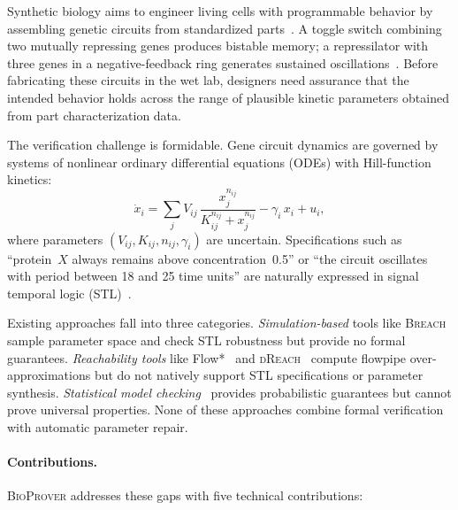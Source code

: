 \documentclass[11pt]{article}
\newcommand{\bioprover}{\textsc{BioProver}}
\newcommand{\dreach}{\textsc{dReach}}
\newcommand{\breach}{\textsc{Breach}}
\newcommand{\stl}{\textsc{STL}}
\begin{document}
Synthetic biology aims to engineer living cells with programmable
behavior by assembling genetic circuits from standardized
parts~\cite{endy2005foundations}. A toggle switch combining two
mutually repressing genes produces bistable memory; a repressilator
with three genes in a negative-feedback ring generates sustained
oscillations~\cite{elowitz2000synthetic}. Before fabricating these
circuits in the wet lab, designers need assurance that the intended
behavior holds across the range of plausible kinetic parameters
obtained from part characterization data.

The verification challenge is formidable. Gene circuit dynamics are
governed by systems of nonlinear ordinary differential equations
(ODEs) with Hill-function kinetics:
\begin{equation}
\label{eq:hill}
  \dot{x}_i = \sum_j V_{ij}\,\frac{x_j^{n_{ij}}}{K_{ij}^{n_{ij}} + x_j^{n_{ij}}}
  - \gamma_i\,x_i + u_i,
\end{equation}
where parameters $(V_{ij}, K_{ij}, n_{ij}, \gamma_i)$ are uncertain.
Specifications such as ``protein~$X$ always remains above
concentration~0.5'' or ``the circuit oscillates with period between
18 and 25 time units'' are naturally expressed in signal temporal
logic (\stl{})~\cite{maler2004monitoring}.

Existing approaches fall into three categories.
\emph{Simulation-based} tools like \breach{}~\cite{donze2010breach}
sample parameter space and check \stl{} robustness but provide no
formal guarantees.
\emph{Reachability tools} like Flow*~\cite{chen2013flow} and
\dreach{}~\cite{kong2015dreach} compute flowpipe
over-approximations but do not natively support \stl{} specifications
or parameter synthesis.
\emph{Statistical model checking}~\cite{younes2006statistical}
provides probabilistic guarantees but cannot prove universal
properties. None of these approaches combine formal verification with
automatic parameter repair.

\paragraph{Contributions.}
\bioprover{} addresses these gaps with five technical contributions:
\end{document}
